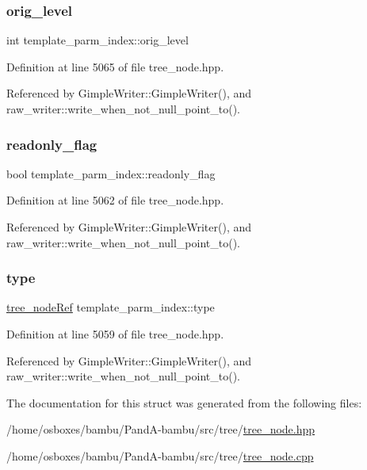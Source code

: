 \subsubsection{\texorpdfstring{orig\+\_\+level}{orig\_level}}
{\footnotesize\ttfamily int template\+\_\+parm\+\_\+index\+::orig\+\_\+level}



Definition at line 5065 of file tree\+\_\+node.\+hpp.



Referenced by Gimple\+Writer\+::\+Gimple\+Writer(), and raw\+\_\+writer\+::write\+\_\+when\+\_\+not\+\_\+null\+\_\+point\+\_\+to().

\mbox{\label{structtemplate__parm__index_aeddbeebec2bc4e728c2014174b129675}} 
\subsubsection{\texorpdfstring{readonly\+\_\+flag}{readonly\_flag}}
{\footnotesize\ttfamily bool template\+\_\+parm\+\_\+index\+::readonly\+\_\+flag}



Definition at line 5062 of file tree\+\_\+node.\+hpp.



Referenced by Gimple\+Writer\+::\+Gimple\+Writer(), and raw\+\_\+writer\+::write\+\_\+when\+\_\+not\+\_\+null\+\_\+point\+\_\+to().

\mbox{\label{structtemplate__parm__index_a70d30acdc6ba55893510c97c1cc231b4}} 
\subsubsection{\texorpdfstring{type}{type}}
{\footnotesize\ttfamily \hyperlink{tree__node_8hpp_a6ee377554d1c4871ad66a337eaa67fd5}{tree\+\_\+node\+Ref} template\+\_\+parm\+\_\+index\+::type}



Definition at line 5059 of file tree\+\_\+node.\+hpp.



Referenced by Gimple\+Writer\+::\+Gimple\+Writer(), and raw\+\_\+writer\+::write\+\_\+when\+\_\+not\+\_\+null\+\_\+point\+\_\+to().



The documentation for this struct was generated from the following files\+:\begin{DoxyCompactItemize}
\item 
/home/osboxes/bambu/\+Pand\+A-\/bambu/src/tree/\hyperlink{tree__node_8hpp}{tree\+\_\+node.\+hpp}\item 
/home/osboxes/bambu/\+Pand\+A-\/bambu/src/tree/\hyperlink{tree__node_8cpp}{tree\+\_\+node.\+cpp}\end{DoxyCompactItemize}
